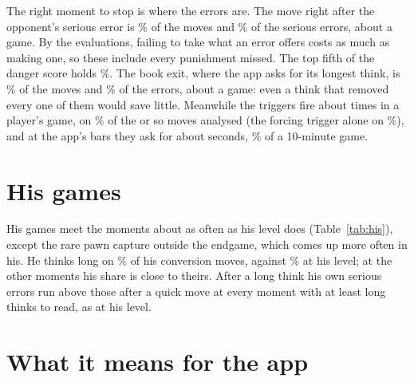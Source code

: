 \documentclass[11pt]{article}
\begin{document}
The right moment to stop is where the errors are. The move right after the opponent's serious error
is \AfterMoves\% of the moves and \AfterErrors\% of the serious errors, about \AfterErrorsPerGame{}
a game. By the evaluations, failing to take what an error offers costs as much as making one, so
these include every punishment missed. The top fifth of the danger score holds \HighErrors\%. The book exit, where the app asks
for its longest think, is \BookEndMoves\% of the moves and \BookEndErrors\% of the errors, about
\BookEndErrorsPerGame{} a game: even a think that removed every one of them would save little.
Meanwhile the triggers fire about \TriggersPerGame{} times in a player's game, on \TriggerShare\% of
the \AnalysedPerGame{} or so moves analysed (the forcing trigger alone on \ForcingShare\%), and at
the app's bars they ask for about \AskedSeconds{} seconds, \AskedShare\% of a 10-minute game.

\section{His games}

\begin{table}[h]
\centering
\small\setlength{\tabcolsep}{4pt}\HisTable
\caption{His \HisGames{} 10-minute games in the app's archive, read the same way and only
described. His error rates come from the routine's engine rather than Lichess's, so they are not
set beside his level's.}
\label{tab:his}
\end{table}

His games meet the moments about as often as his level does (Table~\ref{tab:his}), except the
rare pawn capture outside the endgame, which comes up more often in his. He thinks long
on \HisConversionLong\% of his conversion moves, against \PeersConversionLong\% at his level; at
the other moments his share is close to theirs. After a long think his own serious errors run
above those after a quick move at every moment with at least \HisMinLong{} long thinks to read, as at
his level.

\section{What it means for the app}
\end{document}
